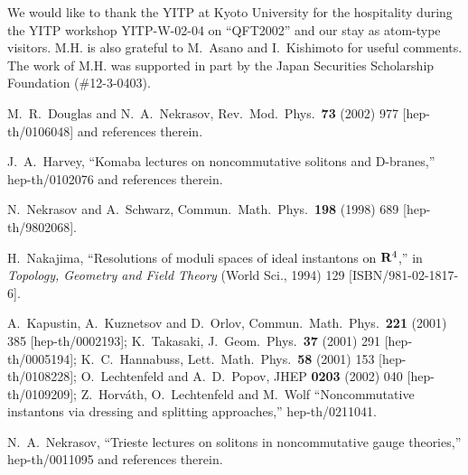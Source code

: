 \documentclass[a4paper,12pt]{article}\setlength{\topmargin}{-1cm}
\begin{document}
\noindent
We would like to thank the YITP at Kyoto University 
for the hospitality during the YITP
workshop YITP-W-02-04 on ``QFT2002''
and our stay as atom-type visitors.
M.H. is also grateful to M.~Asano and I.~Kishimoto for useful comments.
The work of M.H. was supported in part 
by the Japan Securities Scholarship Foundation (\#12-3-0403).


\begin{thebibliography}{99}


M.~R.~Douglas and N.~A.~Nekrasov,
Rev.\ Mod.\ Phys.\  {\bf 73} (2002) 977
[hep-th/0106048]
and references therein.

J.~A.~Harvey,
``Komaba lectures on noncommutative solitons and D-branes,''
hep-th/0102076
and references therein.

N.~Nekrasov and A.~Schwarz,
Commun.\ Math.\ Phys.\ {\bf 198} (1998) 689
[hep-th/9802068].

H.~Nakajima,
``Resolutions of moduli spaces of ideal instantons on ${\bf R}^4$,''
in {\it Topology, Geometry and Field Theory}
(World Sci., 1994) 129
[ISBN/981-02-1817-6].

A.~Kapustin, A.~Kuznetsov and D.~Orlov,
Commun.\ Math.\ Phys.\  {\bf 221} (2001) 385
[hep-th/0002193];
K.~Takasaki,
J.\ Geom.\ Phys.\ {\bf 37} (2001) 291
[hep-th/0005194];
K.~C.~Hannabuss,
Lett.\ Math.\ Phys.\  {\bf 58} (2001) 153
[hep-th/0108228];
O.~Lechtenfeld and A.~D.~Popov,
JHEP {\bf 0203} (2002) 040
[hep-th/0109209];
Z.~Horv\'ath, O.~Lechtenfeld and M.~Wolf
``Noncommutative instantons via dressing and splitting approaches,''
hep-th/0211041.

N.~A.~Nekrasov,
``Trieste lectures on solitons in noncommutative gauge theories,''
hep-th/0011095
and references therein.


\end{thebibliography}
\end{document}
